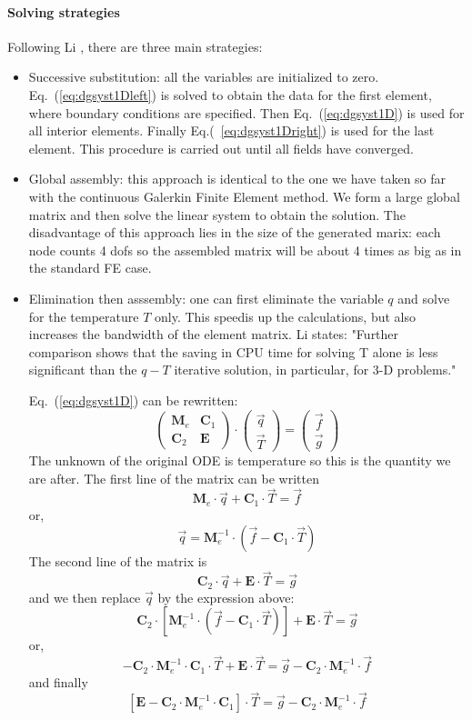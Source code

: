 \paragraph{Solving strategies} Following Li \cite{li06}, there are three main strategies:
\begin{itemize}
\item Successive substitution: all the variables are initialized to zero. 
Eq.~(\ref{eq:dgsyst1Dleft}) is solved
to obtain the data for the first element, where boundary conditions are specified.
Then Eq.~(\ref{eq:dgsyst1D}) is used for all interior elements.
Finally Eq.(~\ref{eq:dgsyst1Dright}) is used for the last element.
This procedure is carried out until all fields have converged.  

\item Global assembly: this approach is identical to the one 
we have taken so far with the continuous Galerkin Finite Element method. 
We form a large global matrix and then solve the linear system 
to obtain the solution. The disadvantage of this approach lies in the size 
of the generated marix: each node counts 4 dofs so the assembled matrix 
will be about 4 times as big as in the standard FE case. 

\item Elimination then asssembly: one can first eliminate the variable $q$
and solve for the temperature $T$ only. This speedis up the
calculations, but also increases the bandwidth of the element matrix. Li \cite{li06}
states: "Further comparison shows that the saving in CPU time for solving T alone is less
significant than the $q-T$ iterative solution, in particular, for 3-D problems."


Eq.~(\ref{eq:dgsyst1D}) can be rewritten:
\begin{equation}
\left(
\begin{array}{cc}
{\bm M}_e & {\bm C}_1 \\
{\bm C}_2 & {\bm E} 
\end{array}
\right)
\cdot
\left(
\begin{array}{c}
\vec{q} \\ \vec{T} 
\end{array}
\right)
=
\left(
\begin{array}{c}
\vec{f} \\ \vec{g} 
\end{array}
\right)
\end{equation}
The unknown of the original ODE is temperature so this is the quantity we are after. 
The first line of the matrix can be written 
\[
 {\bm M}_e \cdot \vec{q}+ {\bm C}_1 \cdot \vec{T} = \vec{f} 
\]
or,
\[
\vec{q} =   {\bm M}_e^{-1} \cdot (\vec{f} -{\bm C}_1 \cdot \vec{T} )
\]
The second line of the matrix is 
\[
{\bm C}_2 \cdot \vec{q} + {\bm E} \cdot \vec{T} =  \vec{g}
\]
and we then replace $\vec{q}$ by the expression above:
\[
{\bm C}_2 \cdot [ {\bm M}_e^{-1}\cdot (\vec{f} -{\bm C}_1\cdot  \vec{T} ) ]
 + {\bm E}\cdot \vec{T} =  \vec{g}
\]
or, 
\[
- {\bm C}_2\cdot {\bm M}_e^{-1}\cdot {\bm C}_1 \cdot \vec{T}  
 + {\bm E}\cdot \vec{T} 
=  \vec{g} - {\bm C}_2\cdot  {\bm M}_e^{-1}\cdot \vec{f}
\]
and finally
\[
[ {\bm E} -  {\bm C}_2 \cdot {\bm M}_e^{-1} \cdot {\bm C}_1 ]\cdot  \vec{T}
=  \vec{g} - {\bm C}_2 \cdot {\bm M}_e^{-1} \cdot \vec{f}
\]
\end{itemize}
